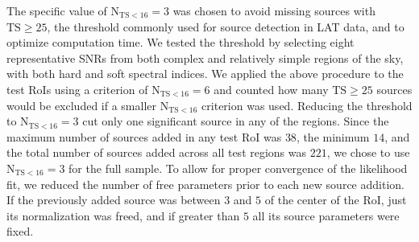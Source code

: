 {The specific value of $\mathrm{N_{TS < 16} = 3}$ was chosen to avoid missing sources with $\mathrm{TS \geq 25}$, the threshold commonly used for source detection in LAT data, and to optimize computation time. We tested the threshold by selecting eight representative SNRs from both complex and relatively simple regions of the sky, with both hard and soft spectral indices. We applied the above procedure to the test RoIs using a criterion of $\mathrm{N_{TS < 16} = 6}$ and counted how many $\mathrm{TS \geq 25}$ sources would be excluded if a smaller $\mathrm{N_{TS < 16}}$ criterion was used. Reducing the threshold to $\mathrm{N_{TS < 16} = 3}$ cut only one significant source in any of the regions. Since the maximum number of sources added in any test RoI was $38$, the minimum $14$, and the total number of sources added across all test regions was $221$, we chose to use $\mathrm{N_{TS < 16} = 3}$ for the full sample. To allow for proper convergence of the likelihood fit, we reduced the number of free parameters prior to each new source addition. If the previously added source was between $3$\degr{} and $5$\degr{} of the center of the RoI, just its normalization was freed, and if greater than $5$\degr{} all its source parameters were fixed.

}
